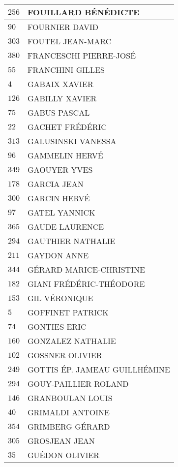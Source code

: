 \begin{xltabular}{\linewidth}{|l|X|}
    $256$ & FOUILLARD BÉNÉDICTE \\
    \hline
    $90$ & FOURNIER DAVID \\
    \hline
    $303$ & FOUTEL JEAN-MARC \\
    \hline
    $380$ & FRANCESCHI PIERRE-JOSÉ \\
    \hline
    $55$ & FRANCHINI GILLES \\
    \hline
    $4$ & GABAIX XAVIER \\
    \hline
    $126$ & GABILLY XAVIER \\
    \hline
    $75$ & GABUS PASCAL \\
    \hline
    $22$ & GACHET FRÉDÉRIC \\
    \hline
    $313$ & GALUSINSKI VANESSA \\
    \hline
    $96$ & GAMMELIN HERVÉ \\
    \hline
    $349$ & GAOUYER YVES \\
    \hline
    $178$ & GARCIA JEAN \\
    \hline
    $300$ & GARCIN HERVÉ \\
    \hline
    $97$ & GATEL YANNICK \\
    \hline
    $365$ & GAUDE LAURENCE \\
    \hline
    $294$ & GAUTHIER NATHALIE \\
    \hline
    $211$ & GAYDON ANNE \\
    \hline
    $344$ & GÉRARD MARICE-CHRISTINE \\
    \hline
    $182$ & GIANI FRÉDÉRIC-THÉODORE \\
    \hline
    $153$ & GIL VÉRONIQUE \\
    \hline
    $5$ & GOFFINET PATRICK \\
    \hline
    $74$ & GONTIES ERIC \\
    \hline
    $160$ & GONZALEZ NATHALIE \\
    \hline
    $102$ & GOSSNER OLIVIER \\
    \hline
    $249$ & GOTTIS ÉP. JAMEAU GUILLHÉMINE \\
    \hline
    $294$ & GOUY-PAILLIER ROLAND \\
    \hline
    $146$ & GRANBOULAN LOUIS \\
    \hline
    $40$ & GRIMALDI ANTOINE \\
    \hline
    $354$ & GRIMBERG GÉRARD \\
    \hline
    $305$ & GROSJEAN JEAN \\
    \hline
    $35$ & GUÉDON OLIVIER \\

\end{xltabular}
